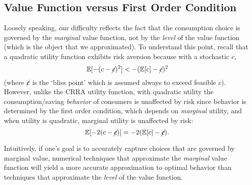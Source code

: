 \documentclass[titlepage, headings=optiontotocandhead]{Resources/texmf-local/tex/latex/econtex}
\begin{document}
\subsection{Value Function versus First Order Condition}\label{subsec:vVsuP}

Loosely speaking, our difficulty reflects the fact that the
consumption choice is governed by the \textit{marginal} value function,
not by the \textit{level} of the value function (which is the object that
we approximated).  To understand this point, recall that a quadratic
utility function
 exhibits
risk aversion because with a stochastic $c$,
\begin{equation}
  \operatorname{\mathbb{E}}[-(c - \cancel{c})^{2}] < - (\operatorname{\mathbb{E}}[c] - \cancel{c})^{2}
\end{equation}
(where $\cancel{c}$ is the `bliss point' which is assumed always to exceed feasible $c$). However, unlike the CRRA utility function,
with quadratic utility the consumption/saving \textit{behavior} of consumers
is unaffected by risk since behavior is determined by the first order condition, which
depends on \textit{marginal} utility, and when utility is quadratic, marginal utility is unaffected
by risk:
\begin{equation}
  \operatorname{\mathbb{E}}[-2(c - \cancel{c})] = - 2(\operatorname{\mathbb{E}}[c] - \cancel{c}).
\end{equation}

Intuitively, if one's goal is to accurately capture choices
that are governed by marginal value,
numerical techniques that approximate the \textit{marginal} value
function will yield a more accurate approximation to
optimal behavior than techniques that approximate the \textit{level}
of the value function.
\end{document}
